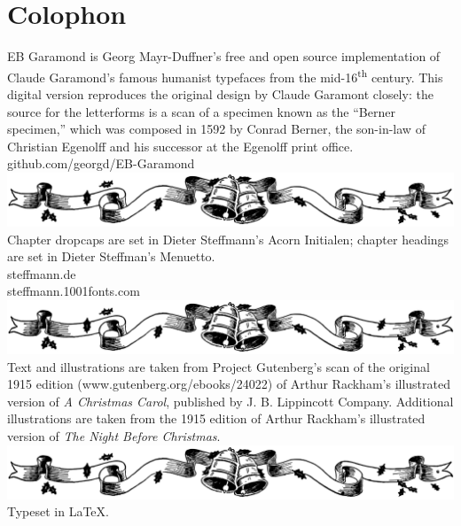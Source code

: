 \documentclass[
paper=5.5in:8.5in,
BCOR=7mm,
twoside,
DIV=calc,
fontsize=12pt,
usegeometry,
dottedtocline,
headers=normal,
listof=numbered,
listof=totoc,
listof=flat,
listof=nochaptergap]{scrbook} %
\begin{document}
\renewcommand*{\chaptermarkformat}{}
\renewcommand*{\chapterheadendvskip}{\vspace{10pt}}
\renewcommand*{\chapterheadstartvskip}{\vspace{0pt}}



\mainmatter
\flushbottom
{}







\cleardoublepage
{}
\chapter*{Colophon}

\centering
EB Garamond is Georg Mayr-Duffner's free and open source implementation of Claude Garamond’s famous humanist typefaces from the mid-16\textsuperscript{th} century. This digital version reproduces the original design by Claude Garamont closely: the source for the letterforms is a scan of a specimen known as the “Berner specimen,” which was composed in 1592 by Conrad Berner, the son-in-law of Christian Egenolff and his successor at the Egenolff print office.\\github.com/georgd/EB-Garamond
\vfill
\includegraphics[width=.5\textwidth]{bells}
\vfill
Chapter dropcaps are set in Dieter Steffmann's Acorn Initialen; chapter headings are set in Dieter Steffman's Menuetto.\\steffmann.de\\steffmann.1001fonts.com
\vfill
\includegraphics[width=.5\textwidth]{bells}
\vfill
Text and illustrations are taken from Project Gutenberg's scan of the original 1915 edition (www.gutenberg.org/ebooks/24022) of Arthur Rackham's illustrated version of \textit{A Christmas Carol}, published by J. B. Lippincott Company. Additional illustrations are taken from the 1915 edition of Arthur Rackham's illustrated version of \textit{The Night Before Christmas}.
\vfill
\includegraphics[width=.5\textwidth]{bells}
\vfill
Typeset in \LaTeX{}.
\thispagestyle{empty}
\end{document}
